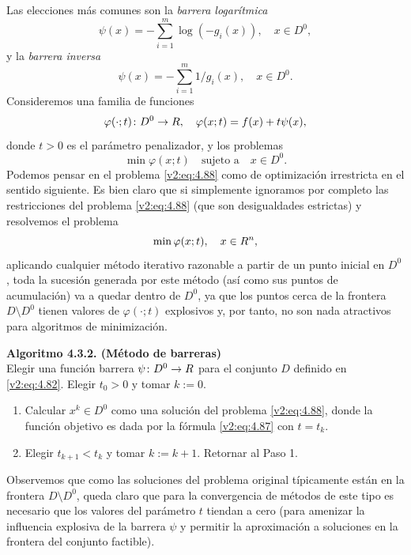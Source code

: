 Las elecciones más comunes son la \textit{barrera logarítmica}
\begin{equation}
    \psi(x) = -\sum_{i=1}^m \log(-g_i(x)), \quad x \in D^0,
    \label{v2:eq:4.85}
\end{equation}
y la \textit{barrera inversa}
\begin{equation}
    \psi(x) = -\sum_{i=1}^m 1/g_i(x), \quad x \in D^0.
    \label{v2:eq:4.86}
\end{equation}
Consideremos una familia de funciones
\begin{equation}
    \varphi(\cdot; t) \colon D^0 \to R, \quad \varphi(x; t) = f(x) + t\psi(x),
    \label{v2:eq:4.87}
\end{equation}
donde $t > 0$ es el parámetro penalizador, y los problemas
\begin{equation}
    \min \varphi(x; t) \quad \text{sujeto a} \quad x \in D^0.
    \label{v2:eq:4.88}
\end{equation}
Podemos pensar en el problema \eqref{v2:eq:4.88} como de optimización irrestricta en el sentido siguiente. Es bien claro que si simplemente ignoramos por completo las restricciones del problema \eqref{v2:eq:4.88} (que son desigualdades estrictas) y resolvemos el problema
\[
    \min \varphi(x; t), \quad x \in R^n,
\]
aplicando cualquier método iterativo razonable a partir de un punto inicial en $D^0$, toda la sucesión generada por este método (así como sus puntos de acumulación) va a quedar dentro de $D^0$, ya que los puntos cerca de la frontera $D \setminus D^0$ tienen valores de $\varphi(\cdot; t)$ explosivos y, por tanto, no son nada atractivos para algoritmos de minimización.

\noindent \textbf{Algoritmo 4.3.2. (Método de barreras)} \\
Elegir una función barrera $\psi \colon D^0 \to R$ para el conjunto $D$ definido en \eqref{v2:eq:4.82}. Elegir $t_0 > 0$ y tomar $k := 0$.
\begin{enumerate}
    \item Calcular $x^k \in D^0$ como una solución del problema \eqref{v2:eq:4.88}, donde la función objetivo es dada por la fórmula \eqref{v2:eq:4.87} con $t = t_k$.
    \item Elegir $t_{k+1} < t_k$ y tomar $k := k + 1$. Retornar al Paso 1.
\end{enumerate}

Observemos que como las soluciones del problema original típicamente están en la frontera $D \setminus D^0$, queda claro que para la convergencia de métodos de este tipo es necesario que los valores del parámetro $t$ tiendan a cero (para amenizar la influencia explosiva de la barrera $\psi$ y permitir la aproximación a soluciones en la frontera del conjunto factible).

